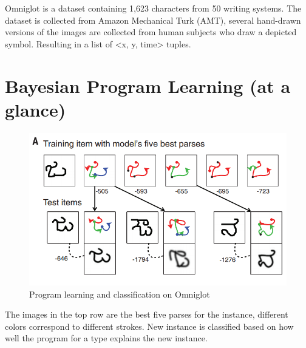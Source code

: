 \documentclass[11pt]{article}
\begin{document}
Omniglot is a dataset containing 1,623 characters from 50 writing systems.
The dataset is collected from Amazon Mechanical Turk (AMT), several hand-drawn versions of the images are collected from human subjects who draw a depicted symbol.
Resulting in a list of <x, y, time> tuples.

\section{Bayesian Program Learning (at a glance)}
\label{sec-4}

\begin{figure}[htb]
\centering
\includegraphics[width=.9\linewidth]{./md_slides/_images/bpl_omniglot.png}
\caption{Program learning and classification on Omniglot}
\end{figure}

The images in the top row are the best five parses for the instance, different colors correspond to different strokes.
New instance is classified based on how well the program for a type explains the new instance. 
\end{document}
